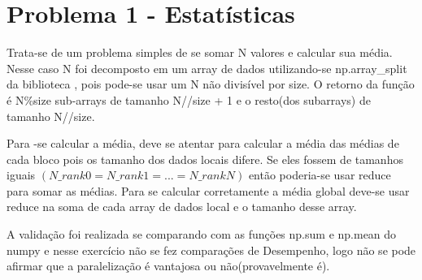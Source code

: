 \section{Problema 1 - Estatísticas}
Trata-se de um problema simples de se somar N valores e calcular sua média. Nesse caso N foi decomposto em um array de dados utilizando-se np.array\_split da biblioteca , pois pode-se usar um N não divisível por size. O retorno da função é N\%size sub-arrays de tamanho N//size + 1 e o resto(dos subarrays) de tamanho N//size. 

Para -se calcular a média, deve se atentar para calcular a média das médias de cada bloco pois os tamanho dos dados locais difere. Se eles fossem de tamanhos iguais $(N\_rank0 = N\_rank1 = ... = N\_rankN)$ então poderia-se usar reduce para somar as médias.
Para se calcular corretamente a média global deve-se usar reduce na soma de cada array de dados local e o tamanho desse array. 

A validação foi realizada se comparando com as funções np.sum e np.mean do numpy e nesse exercício não se fez comparações de Desempenho, logo não se pode afirmar que a paralelização é vantajosa ou não(provavelmente é).
